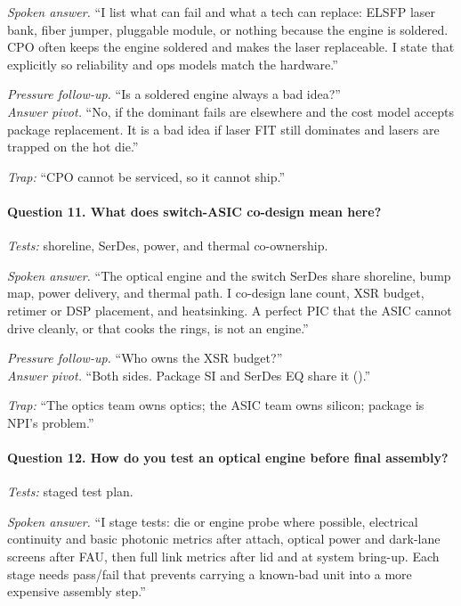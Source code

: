 \textit{Spoken answer.}
``I list what can fail and what a tech can replace: ELSFP laser bank, fiber
jumper, pluggable module, or nothing because the engine is soldered. CPO often
keeps the engine soldered and makes the laser replaceable. I state that
explicitly so reliability and ops models match the hardware.''

\textit{Pressure follow-up.} ``Is a soldered engine always a bad idea?''\\
\textit{Answer pivot.} ``No, if the dominant fails are elsewhere and the cost
model accepts package replacement. It is a bad idea if laser FIT still
dominates and lasers are trapped on the hot die.''

\textit{Trap:} ``CPO cannot be serviced, so it cannot ship.''

\paragraph{Question 11. What does switch-ASIC co-design mean here?}
\textit{Tests:} shoreline, SerDes, power, and thermal co-ownership.

\textit{Spoken answer.}
``The optical engine and the switch SerDes share shoreline, bump map, power
delivery, and thermal path. I co-design lane count, XSR budget, retimer or
DSP placement, and heatsinking. A perfect PIC that the ASIC cannot drive
cleanly, or that cooks the rings, is not an engine.''

\textit{Pressure follow-up.} ``Who owns the XSR budget?''\\
\textit{Answer pivot.} ``Both sides. Package SI and SerDes EQ share it
().''

\textit{Trap:} ``The optics team owns optics; the ASIC team owns silicon;
package is NPI's problem.''

\paragraph{Question 12. How do you test an optical engine before final
assembly?}
\textit{Tests:} staged test plan.

\textit{Spoken answer.}
``I stage tests: die or engine probe where possible, electrical continuity and
basic photonic metrics after attach, optical power and dark-lane screens after
FAU, then full link metrics after lid and at system bring-up. Each stage needs
pass/fail that prevents carrying a known-bad unit into a more expensive
assembly step.''

